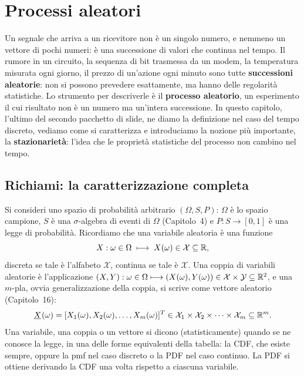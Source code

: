 \chapter{Processi aleatori}

Un segnale che arriva a un ricevitore non è un singolo numero, e nemmeno un vettore di pochi numeri: è una successione
di valori che continua nel tempo. Il rumore in un circuito, la sequenza di bit trasmessa da un modem, la temperatura
misurata ogni giorno, il prezzo di un'azione ogni minuto sono tutte \textbf{successioni aleatorie}: non si possono
prevedere esattamente, ma hanno delle regolarità statistiche. Lo strumento per descriverle è il \textbf{processo
aleatorio}, un esperimento il cui risultato non è un numero ma un'intera successione. In questo capitolo, l'ultimo del
secondo pacchetto di slide, ne diamo la definizione nel caso del tempo discreto, vediamo come si caratterizza e
introduciamo la nozione più importante, la \textbf{stazionarietà}: l'idea che le proprietà statistiche del processo non
cambino nel tempo.

\section{Richiami: la caratterizzazione completa}

Si consideri uno spazio di probabilità arbitrario $(\Omega, S, P)$: $\Omega$ è lo spazio campione, $S$ è una
$\sigma$-algebra di eventi di $\Omega$ (Capitolo~4) e $P : S \to [0, 1]$ è una legge di probabilità. Ricordiamo che una
variabile aleatoria è una funzione
\[ X : \omega \in \Omega \;\longmapsto\; X(\omega) \in \mathcal{X} \subseteq \mathbb{R} , \]
discreta se tale è l'alfabeto $\mathcal{X}$, continua se tale è $\mathcal{X}$. Una coppia di variabili aleatorie è
l'applicazione $(X, Y) : \omega \in \Omega \longmapsto (X(\omega), Y(\omega)) \in \mathcal{X} \times \mathcal{Y}
\subseteq \mathbb{R}^2$, e una $m$-pla, ovvia generalizzazione della coppia, si scrive come vettore aleatorio (Capitolo~16):
\[ {\mkern1mu\underline{X}\mkern1mu}(\omega) = [X_1(\omega), X_2(\omega), \ldots, X_m(\omega)]^T \in \mathcal{X}_1 \times \mathcal{X}_2 \times
   \cdots \times \mathcal{X}_m \subseteq \mathbb{R}^m . \]
Una variabile, una coppia o un vettore si dicono  (statisticamente) quando se ne
conosce la legge, in una delle forme equivalenti della tabella: la CDF, che esiste sempre, oppure la pmf nel caso
discreto o la PDF nel caso continuo. La PDF si ottiene derivando la CDF una volta rispetto a ciascuna variabile.

